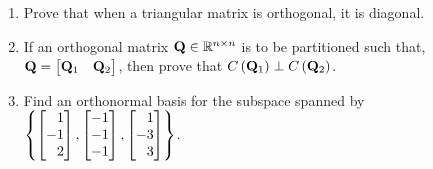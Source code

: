 \documentclass[9pt]{article}
\def\mf{\ensuremath\mathbf}
\def\mb{\ensuremath\mathbb}
\def\lp{\ensuremath\left(}
\def\rp{\ensuremath\right)}
\def\lc{\ensuremath\left\{}
\def\rc{\ensuremath\right\}}
\def\bmx{\ensuremath\begin{bmatrix*}[r]}
\def\emx{\ensuremath\end{bmatrix*}}
\begin{document}
\begin{multicols}{2}
\begin{enumerate}
    \item Prove that when a triangular matrix is orthogonal, it is diagonal.

    \item If an orthogonal matrix $\mf{Q} \in \mb{R}^{n \times n}$ is to be partitioned such that, $\mf{Q} = \bmx \mf{Q}_1 & \mf{Q}_2\emx$, then prove that $C\lp\mf{Q}_1\rp \perp C\lp\mf{Q}_2\rp$.

    \item Find an orthonormal basis for the subspace spanned by $\lc \bmx1\\-1\\2\emx, \bmx-1\\-1\\-1\emx, \bmx1\\-3\\3\emx \rc$.

\end{enumerate}


\end{multicols}
\end{document}
